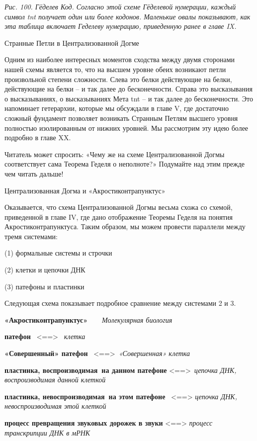 \documentclass[../main.tex]{subfiles}
\begin{document}
\emph{Рис. 100. Гёделев Код. Согласно этой схеме Гёделевой нумерации, каждый символ \acs{tnt} получает один или более кодонов. Маленькие овалы показывают, как эта таблица включает Геделеву нумерацию, приведенную ранее в главе IX.}

Странные Петли в Централизованной Догме

Одним из наиболее интересных моментов сходства между двумя сторонами нашей схемы является то, что на высшем уровне обеих возникают петли произвольной степени сложности. Слева это белки действующие на белки, действующие на белки \--- и так далее до бесконечности. Справа это высказывания о высказываниях, о высказываниях Мета \acs{tnt} \--- и так далее до бесконечности. Это напоминает гетерархии, которые мы обсуждали в главе V, где достаточно сложный фундамент позволяет возникать Странным Петлям высшего уровня полностью изолированным от нижних уровней. Мы рассмотрим эту идею более подробно в главе XX.

Читатель может спросить: «Чему же на схеме Централизованной Догмы соответствует сама Теорема Геделя о неполноте?» Подумайте над этим прежде чем читать дальше!

Централизованная Догма и «Акростиконтрапунктус»

Оказывается, что схема Централизованной Догмы весьма схожа со схемой, приведенной в главе IV, где дано отображение Теоремы Геделя на понятия Акростиконтрапунктуса. Таким образом, мы можем провести параллели между тремя системами:

(1) формальные системы и строчки

(2) клетки и цепочки ДНК

(3) патефоны и пластинки

Следующая схема показывает подробное сравнение между системами 2 и 3.

\textbf{«Акростиконтрапунктус»~~~} \emph{Молекулярная биология}

\textbf{патефон} ~\textless==\textgreater~ \emph{клетка}

\textbf{«Совершенный» патефон} ~\textless==\textgreater~\emph{«Совершенная» клетка}

\textbf{пластинка, воспроизводимая~на данном патефоне} \textless==\textgreater~\emph{цепочка ДНК, воспроизводимая данной клеткой}

\textbf{пластинка, невоспроизводимая~на этом патефоне} ~\textless==\textgreater{} \emph{цепочка ДНК, невоспроизводимая этой клеткой}

\textbf{процесс превращения звуковых дорожек в звуки} \textless==\textgreater{} \emph{процесс транскрипции ДНК в мРНК}
\end{document}
